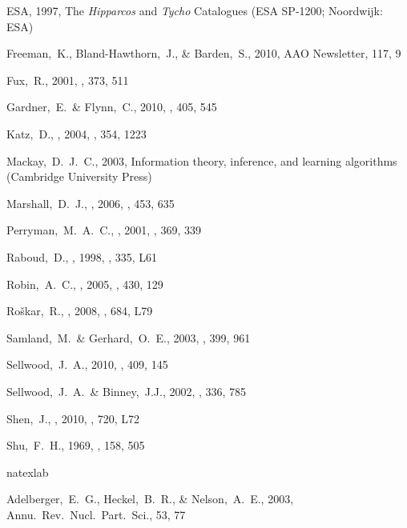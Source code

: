 \begin{thebibliography}{99}
{ESA}, 1997, {The \emph{Hipparcos} and \emph{Tycho} Catalogues} (ESA SP-1200; Noordwijk: ESA)

  Freeman,~K., Bland-Hawthorn,~J., \& Barden,~S., 2010, 
  AAO Newsletter, 117, 9

  Fux,~R., 2001,
  \aap, 373, 511

  Gardner,~E.~\& Flynn,~C., 2010,
  \mnras, 405, 545

  Katz,~D., \etal, 2004,
\mnras, 354, 1223

  Mackay,~D.~J.~C., 2003,
  Information theory, inference, and learning algorithms (Cambridge University Press)

  Marshall,~D.~J., \etal, 2006,
  \aap, 453, 635

  Perryman,~M.~A.~C., \etal, 2001,
  \aap, 369, 339

  Raboud,~D., \etal, 1998,
  \aap, 335, L61

  Robin,~A.~C., \etal, 2005,
  \aap, 430, 129

  Ro{\v s}kar,~R., \etal, 2008,
  \apjl, 684, L79

  Samland,~M.~\& Gerhard,~O.~E., 2003,
  \aap, 399, 961

  Sellwood,~J.~A., 2010,
  \mnras, 409, 145

  Sellwood,~J.~A.~\& Binney,~J.J., 2002,
  \mnras, 336, 785

  Shen,~J., \etal, 2010, \apj, 720, L72

  Shu,~F.~H., 1969,
  \apj, 158, 505



\expandafter\ifx\csname natexlab\endcsname\relax\def\natexlab#1{#1}\fi

  Adelberger,~E.~G., Heckel,~B.~R., \& Nelson,~A.~E., 2003,
  Annu.~Rev.~Nucl.~Part.~Sci., 53, 77


\end{thebibliography}
